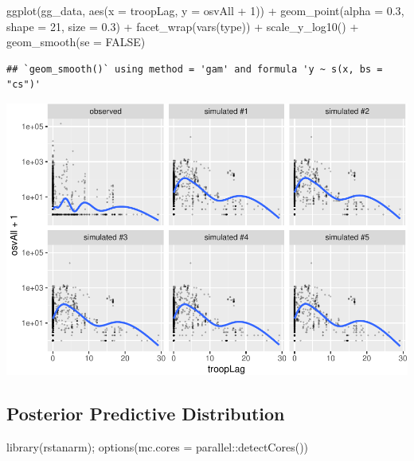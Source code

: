 \documentclass[
]{book}
\newenvironment{Shaded}{\begin{snugshade}}{\end{snugshade}}
\newcommand{\AttributeTok}[1]{\textcolor[rgb]{0.77,0.63,0.00}{#1}}
\newcommand{\ConstantTok}[1]{\textcolor[rgb]{0.00,0.00,0.00}{#1}}
\newcommand{\DecValTok}[1]{\textcolor[rgb]{0.00,0.00,0.81}{#1}}
\newcommand{\FloatTok}[1]{\textcolor[rgb]{0.00,0.00,0.81}{#1}}
\newcommand{\FunctionTok}[1]{\textcolor[rgb]{0.00,0.00,0.00}{#1}}
\newcommand{\NormalTok}[1]{#1}
\newcommand{\SpecialCharTok}[1]{\textcolor[rgb]{0.00,0.00,0.00}{#1}}
\begin{document}
\begin{Shaded}
\begin{Highlighting}[]
\FunctionTok{ggplot}\NormalTok{(gg\_data, }\FunctionTok{aes}\NormalTok{(}\AttributeTok{x =}\NormalTok{ troopLag, }\AttributeTok{y =}\NormalTok{ osvAll }\SpecialCharTok{+} \DecValTok{1}\NormalTok{)) }\SpecialCharTok{+} 
  \FunctionTok{geom\_point}\NormalTok{(}\AttributeTok{alpha =} \FloatTok{0.3}\NormalTok{, }\AttributeTok{shape =} \DecValTok{21}\NormalTok{, }\AttributeTok{size =} \FloatTok{0.3}\NormalTok{) }\SpecialCharTok{+} 
  \FunctionTok{facet\_wrap}\NormalTok{(}\FunctionTok{vars}\NormalTok{(type)) }\SpecialCharTok{+} 
  \FunctionTok{scale\_y\_log10}\NormalTok{() }\SpecialCharTok{+} 
  \FunctionTok{geom\_smooth}\NormalTok{(}\AttributeTok{se =} \ConstantTok{FALSE}\NormalTok{)}
\end{Highlighting}
\end{Shaded}

\begin{verbatim}
## `geom_smooth()` using method = 'gam' and formula 'y ~ s(x, bs = "cs")'
\end{verbatim}

\includegraphics{03-03-poisson-model_files/figure-latex/unnamed-chunk-4-2.pdf}

\hypertarget{posterior-predictive-distribution}{%
\subsection{Posterior Predictive Distribution}\label{posterior-predictive-distribution}}

\begin{Shaded}
\begin{Highlighting}[]
\FunctionTok{library}\NormalTok{(rstanarm); }\FunctionTok{options}\NormalTok{(}\AttributeTok{mc.cores =}\NormalTok{ parallel}\SpecialCharTok{::}\FunctionTok{detectCores}\NormalTok{())}
\end{Highlighting}
\end{Shaded}
\end{document}
